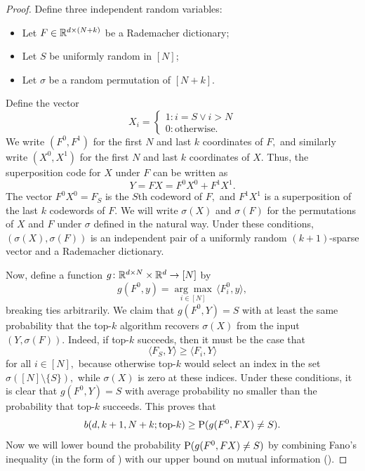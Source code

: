 \begin{proof}
Define three independent random variables:
\begin{itemize}
\item Let $F \in \mathbb{R}^{d \times (N + k)}$ be a Rademacher dictionary;
\item Let $S$ be uniformly random in $[N]$;
\item Let $\sigma$ be a random permutation of $[N + k]$.
\end{itemize}
Define the vector
$$
X_i = \begin{cases}
1 : i = S \lor i > N \\
0 : \text{otherwise}.
\end{cases}
$$
We write $(F^0, F^1)$ for the first $N$ and last $k$ coordinates of $F,$ and similarly write $(X^0, X^1)$ for the first $N$ and last $k$ coordinates of $X.$ Thus, the superposition code for $X$ under $F$ can be written as
$$
Y = F X = F^0 X^0 + F^1 X^1.
$$
The vector $F^0 X^0 = F_S$ is the $S$th codeword of $F,$ and $F^1 X^1$ is a superposition of the last $k$ codewords of $F.$ We will write $\sigma(X)$ and $\sigma(F)$ for the permutations of $X$ and $F$ under $\sigma$ defined in the natural way. Under these conditions, $(\sigma(X), \sigma(F))$ is an independent pair of a uniformly random $(k + 1)$-sparse vector and a Rademacher dictionary.

Now, define a function $g \colon \mathbb{R}^{d \times N} \times \mathbb{R}^d \to [N]$ by
$$
g(F^0, y) = \underset{i \in [N]}{\arg \max} \, \langle F^0_i, y \rangle,
$$
breaking ties arbitrarily. We claim that $g(F^0, Y) = S$ with at least the same probability that the top-$k$ algorithm recovers $\sigma(X)$ from the input $(Y, \sigma(F)).$ Indeed, if top-$k$ succeeds, then it must be the case that
$$
\langle F_S, Y \rangle \ge \langle F_i, Y \rangle
$$
for all $i \in [N],$ because otherwise top-$k$ would select an index in the set $\sigma([N] \setminus \{S \}),$ while $\sigma(X)$ is zero at these indices. Under these conditions, it is clear that $g(F^0, Y) = S$ with average probability no smaller than the probability that top-$k$ succeeds. This proves that
$$
b(d, k + 1, N + k; \text{top-}k) \ge \operatorname{P}(g(F^0, F X) \neq S).
$$
Now we will lower bound the probability $\operatorname{P}(g(F^0, F X) \neq S)$ by combining Fano's inequality (in the form of ) with our upper bound on mutual information ().


\end{proof}
